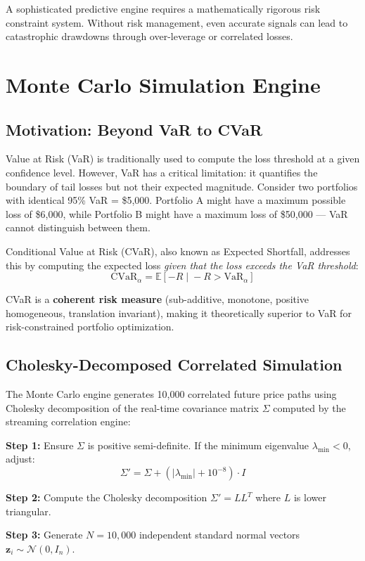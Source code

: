 \documentclass[letterpaper,11pt]{report}
\begin{document}
A sophisticated predictive engine requires a mathematically rigorous risk constraint system. Without risk management, even accurate signals can lead to catastrophic drawdowns through over-leverage or correlated losses.

\section{Monte Carlo Simulation Engine}

\subsection{Motivation: Beyond VaR to CVaR}

Value at Risk (VaR) is traditionally used to compute the loss threshold at a given confidence level. However, VaR has a critical limitation: it quantifies the boundary of tail losses but not their expected magnitude. Consider two portfolios with identical 95\% VaR = \$5,000. Portfolio A might have a maximum possible loss of \$6,000, while Portfolio B might have a maximum loss of \$50,000 --- VaR cannot distinguish between them.

Conditional Value at Risk (CVaR), also known as Expected Shortfall, addresses this by computing the expected loss \emph{given that the loss exceeds the VaR threshold}:
$$\text{CVaR}_\alpha = \mathbb{E}[-R \;|\; -R > \text{VaR}_\alpha]$$

CVaR is a \textbf{coherent risk measure} (sub-additive, monotone, positive homogeneous, translation invariant), making it theoretically superior to VaR for risk-constrained portfolio optimization.

\subsection{Cholesky-Decomposed Correlated Simulation}

The Monte Carlo engine generates 10,000 correlated future price paths using Cholesky decomposition of the real-time covariance matrix $\Sigma$ computed by the streaming correlation engine:

\textbf{Step 1:} Ensure $\Sigma$ is positive semi-definite. If the minimum eigenvalue $\lambda_{\min} < 0$, adjust:
$$\Sigma' = \Sigma + (|\lambda_{\min}| + 10^{-8}) \cdot I$$

\textbf{Step 2:} Compute the Cholesky decomposition $\Sigma' = LL^T$ where $L$ is lower triangular.

\textbf{Step 3:} Generate $N = 10{,}000$ independent standard normal vectors $\mathbf{z}_i \sim \mathcal{N}(0, I_n)$.
\end{document}
